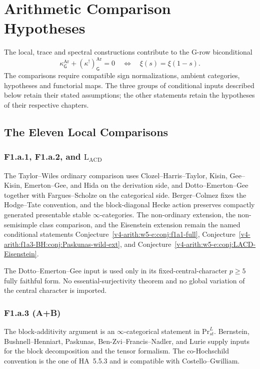 \chapter{Arithmetic Comparison Hypotheses}
\label{v4-arith:w6-j:chapter}

The local, trace and spectral constructions contribute to the G-row
biconditional
\[
\kappa^{\mathrm{Ar}}_{\mathsf{G}}
  +(\kappa^{!})^{\mathrm{Ar}}_{\mathsf{G}}=0
\quad\Longleftrightarrow\quad
\xi(s)=\xi(1-s).
\]
The comparisons require compatible sign normalizations, ambient
categories, hypotheses and functorial maps. The three groups of conditional
inputs described below retain their stated assumptions; the other
statements retain the hypotheses of their respective chapters.

\section{The Eleven Local Comparisons}
\label{v4-arith:w6-j:local-comparisons}

\subsection{F1.a.1, F1.a.2, and \(\mathrm{L}_{\mathrm{ACD}}\)}
\label{v4-arith:w6-j:ch49}

The Taylor--Wiles ordinary comparison uses Clozel--Harris--Taylor,
Kisin, Gee--Kisin, Emerton--Gee, and Hida on the derivation side, and
Dotto--Emerton--Gee together with Fargues--Scholze on the categorical
side. Berger--Colmez fixes the
Hodge--Tate convention, and the block-diagonal Hecke action preserves
compactly generated presentable stable \(\infty\)-categories.  The
non-ordinary extension, the non-semisimple class comparison, and the
Eisenstein extension remain the named conditional statements
Conjecture~\ref{v4-arith:w5-e:conj:f1a1-full},
Conjecture~\ref{v4-arith:f1a3-BH:conj:Paskunas-wild-ext}, and
Conjecture~\ref{v4-arith:w5-e:conj:LACD-Eisenstein}.

The Dotto--Emerton--Gee input is used only in its fixed-central-character
\(p\geq5\) fully faithful form.  No essential-surjectivity theorem and
no global variation of the central character is imported.

\subsection{F1.a.3 (A+B)}
\label{v4-arith:w6-j:ch50}

The block-additivity argument is an \(\infty\)-categorical statement in
\(\mathrm{Pr}^{L}_{st}\).  Bernstein, Bushnell--Henniart, Paskunas,
Ben-Zvi--Francis--Nadler, and Lurie supply inputs for the block
decomposition and the tensor formalism.  The co-Hochschild convention is
the one of HA~5.5.3 and is compatible with Costello--Gwilliam.

